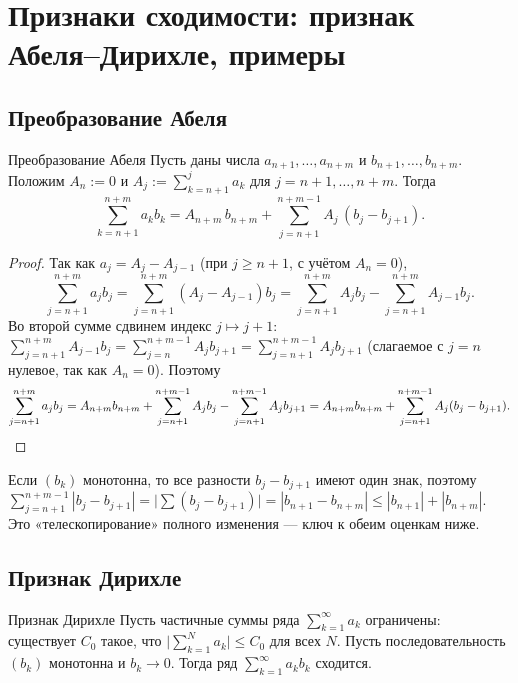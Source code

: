
\section{Признаки сходимости: признак Абеля--Дирихле, примеры}

\subsection*{Преобразование Абеля}

\begin{Lemma}{Преобразование Абеля}{}
	Пусть даны числа $a_{n+1},\dots,a_{n+m}$ и $b_{n+1},\dots,b_{n+m}$. Положим
	$A_n:=0$ и $A_j:=\sum_{k=n+1}^{j} a_k$ для $j=n+1,\dots,n+m$. Тогда
	\[
	\sum_{k=n+1}^{n+m} a_k b_k
	= A_{n+m}\,b_{n+m}
	+\sum_{j=n+1}^{n+m-1} A_j\,(b_j-b_{j+1}).
	\]
\end{Lemma}

\begin{proof}
	Так как $a_j=A_j-A_{j-1}$ (при $j\ge n+1$, с учётом $A_n=0$),
	\[
	\sum_{j=n+1}^{n+m} a_j b_j
	=\sum_{j=n+1}^{n+m} (A_j-A_{j-1}) b_j
	=\sum_{j=n+1}^{n+m} A_j b_j-\sum_{j=n+1}^{n+m} A_{j-1} b_j.
	\]
	Во второй сумме сдвинем индекс $j\mapsto j+1$:
	$\sum_{j=n+1}^{n+m} A_{j-1} b_j=\sum_{j=n}^{n+m-1} A_j b_{j+1}
	=\sum_{j=n+1}^{n+m-1} A_j b_{j+1}$ (слагаемое с $j=n$ нулевое, так как
	$A_n=0$). Поэтому
	\[
	\sum_{j=n+1}^{n+m} a_j b_j
	=A_{n+m} b_{n+m}+\sum_{j=n+1}^{n+m-1} A_j b_j-\sum_{j=n+1}^{n+m-1} A_j b_{j+1}
	=A_{n+m} b_{n+m}+\sum_{j=n+1}^{n+m-1} A_j (b_j-b_{j+1}). \qedhere
	\]
\end{proof}

\begin{Remark}{}{}
	Если $(b_k)$ монотонна, то все разности $b_j-b_{j+1}$ имеют один знак,
	поэтому
	$\sum_{j=n+1}^{n+m-1}|b_j-b_{j+1}|=\bigl|\sum (b_j-b_{j+1})\bigr|
	=|b_{n+1}-b_{n+m}|\le|b_{n+1}|+|b_{n+m}|$. Это «телескопирование» полного
	изменения --- ключ к обеим оценкам ниже.
\end{Remark}

\subsection*{Признак Дирихле}

\begin{Theorem}{Признак Дирихле}{}
	Пусть частичные суммы ряда $\sum_{k=1}^{\infty} a_k$ ограничены: существует
	$C_0$ такое, что $\bigl|\sum_{k=1}^{N} a_k\bigr|\le C_0$ для всех $N$. Пусть
	последовательность $(b_k)$ монотонна и $b_k\to0$. Тогда ряд
	$\sum_{k=1}^{\infty} a_k b_k$ сходится.
\end{Theorem}

